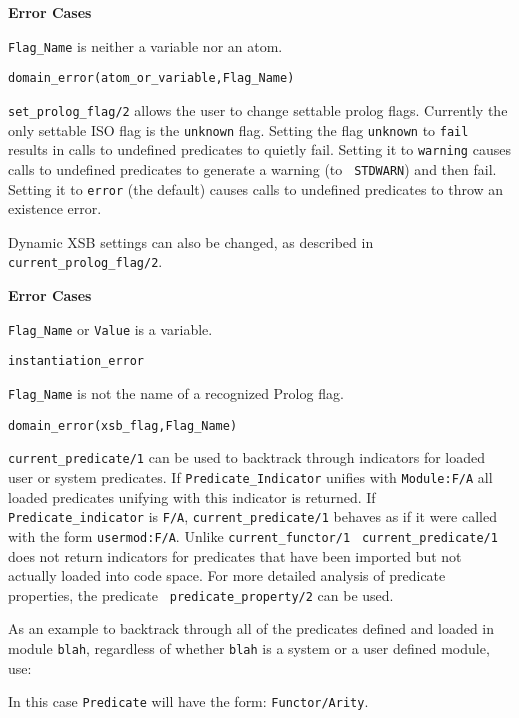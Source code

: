 \begin{description}
{\bf Error Cases}
\bi
\item 	{\tt Flag\_Name} is neither a variable nor an atom.
\bi
\item 	{\tt domain\_error(atom\_or\_variable,Flag\_Name)}
\ei
\ei

%
{\tt set\_prolog\_flag/2} allows the user to change settable prolog
flags.  Currently the only settable ISO flag is the {\tt unknown}
flag.  Setting the flag {\tt unknown} to {\tt fail} results in calls
to undefined predicates to quietly fail.  Setting it to {\tt warning}
causes calls to undefined predicates to generate a warning (to {\tt
  STDWARN}) and then fail.  Setting it to {\tt error} (the default)
causes calls to undefined predicates to throw an existence error.

Dynamic XSB settings can also be changed, as described in {\tt
  current\_prolog\_flag/2}.

{\bf Error Cases}
\bi
\item 	{\tt Flag\_Name} or {\tt Value} is a variable.
\bi
\item 	{\tt instantiation\_error}
\ei
%
\item 	{\tt Flag\_Name} is not the name of a recognized Prolog flag.
\bi
\item 	{\tt domain\_error(xsb\_flag,Flag\_Name)}
\ei
\ei

%
{\tt current\_predicate/1} can be used to backtrack through indicators
for loaded user or system predicates.  If {\tt Predicate\_Indicator}
unifies with {\tt Module:F/A} all loaded predicates unifying with this
indicator is returned.  If {\tt Predicate\_indicator} is {\tt F/A},
{\tt current\_predicate/1} behaves as if it were called with the form
{\tt usermod:F/A}.  Unlike {\tt current\_functor/1} {\tt
current\_predicate/1} does not return indicators for predicates that
have been imported but not actually loaded into code space.  For more
detailed analysis of predicate properties, the predicate {\tt
predicate\_property/2} can be used.

As an example to backtrack through all of the predicates defined and loaded in
module {\tt blah}, regardless of whether {\tt blah} is a system or a
user defined module, use:


    In this case {\tt Predicate} will have the form: {\tt Functor/Arity}.


\end{description}
